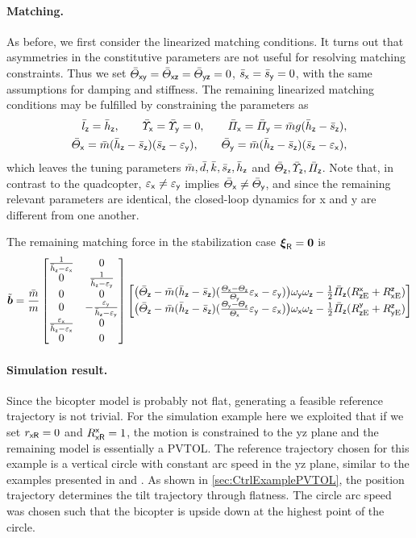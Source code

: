 \paragraph{Matching.}
As before, we first consider the linearized matching conditions.
It turns out that asymmetries in the constitutive parameters are not useful for resolving matching constraints.
Thus we set $\Jcxy=\Jcxz=\Jcyz=0$, $\scx=\scy=0$, with the same assumptions for damping and stiffness.
The remaining linearized matching conditions may be fulfilled by constraining the parameters as
\begin{subequations}
\begin{align} 
 \lcz = \hcz,
\qquad
 \sigcx = \sigcy = 0,
\qquad
 \kapcx = \kapcy = \mc \gravityAccConst (\hcz-\scz),
\\
 \Jcx = \mc (\hcz-\scz)(\scz-\epsy),
\qquad
 \Jcy = \mc(\hcz-\scz) (\scz-\epsx),
\end{align}
\end{subequations}
which leaves the tuning parameters $\mc, \dc, \kc, \scz, \hcz$ and $\Jcz, \sigcz, \kapcz$.
Note that, in contrast to the quadcopter, $\epsx \neq \epsy$ implies $\Jcx \neq \Jcy$, and since the remaining relevant parameters are identical, the closed-loop dynamics for x and y are different from one another.

The remaining matching force in the stabilization case $\sysVelR = \tuple{0}$ is
\begin{align}
 \tilde{\sysForce} = \frac{\mc}{m}
 \begin{bmatrix} \frac{1}{\hcz-\epsx} & 0 \\ 0 & \frac{1}{\hcz-\epsy} \\ 0 & 0 \\ 0 & -\frac{\epsy}{\hcz-\epsy} \\ \frac{\epsx}{\hcz-\epsx} & 0 \\ 0 & 0 \end{bmatrix}
 \begin{bmatrix}
  \big( \Jcz - \mc(\hcz-\scz) (\tfrac{\Jx-\Jz}{\Jy}\epsx - \epsy) \big) \wy\wz - \tfrac{1}{2} \kapcz (\RExz+\REzx) \\
  \big( \Jcz - \mc(\hcz-\scz) (\tfrac{\Jy-\Jz}{\Jx}\epsy - \epsx) \big) \wx\wz - \tfrac{1}{2} \kapcz (\REyz+\REzy)
 \end{bmatrix}
\end{align}

\paragraph{Simulation result.}
Since the bicopter model is probably not flat, generating a feasible reference trajectory is not trivial.
For the simulation example here we exploited that if we set $\rRx = 0$ and $\RRxx=1$, the motion is constrained to the yz plane and the remaining model is essentially a PVTOL.
The reference trajectory chosen for this example is a vertical circle with constant arc speed in the yz plane, similar to the examples presented in \cite{Konz:AT} and \cite{Konz:GaussTrackingControl}.
As shown in \autoref{sec:CtrlExamplePVTOL}, the position trajectory determines the tilt trajectory through flatness.
The circle arc speed was chosen such that the bicopter is upside down at the highest point of the circle.

